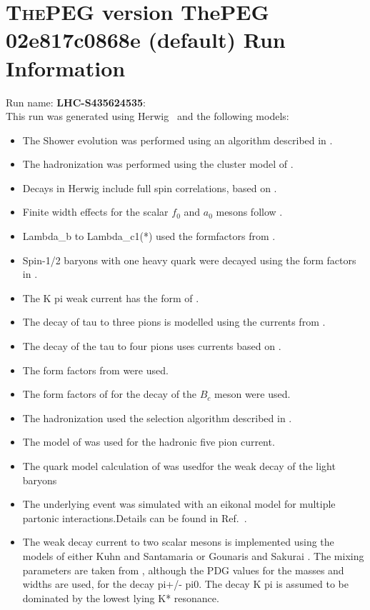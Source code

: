\documentclass{article}
\begin{document}
\appendix
\section[xxx]{\textsc{ThePEG} version ThePEG 02e817c0868e (default) \cite{ThePEG} Run Information}
Run name: \textbf{LHC-S435624535}:\\
This run was generated using Herwig~\cite{Bahr:2008pv} and the following models:
\begin{itemize}
\item The Shower evolution was performed using an algorithm described in \cite{Marchesini:1983bm,Marchesini:1987cf,Gieseke:2003rz,Bahr:2008pv}.
\item The hadronization was performed using the cluster model of \cite{Webber:1983if}.
\item Decays in Herwig include full spin correlations, based on \cite{Richardson:2001df}.
\item Finite width effects for the scalar $f_0$ and $a_0$ mesons follow \cite{Flatte:1976xu}.
\item Lambda_b to Lambda_c1(*) used the formfactors from \cite{Huang:2000xw}.
\item Spin-1/2 baryons with one heavy quark were decayed using the form factors in \cite{Singleton:1990ye}.
\item The K pi weak current has the form of \cite{Finkemeier:1996dh}.
\item The decay of tau to three pions is modelled using the currents from \cite{Asner:1999kj}.
\item The decay of the tau to four pions uses currents based on \cite{Bondar:2002mw}.
\item The form factors from \cite{Ivanov:1996fj} were used.
\item The form factors of \cite{Kiselev:2002vz} for the decay of the $B_c$ meson were used.
\item The hadronization used the selection algorithm described in \cite{Kupco:1998fx}.
\item The model of \cite{Kuhn:2006nw} was used for the hadronic five pion current.
\item The quark model calculation of \cite{Schlumpf:1994fb} was usedfor the weak decay of the light baryons
\item The underlying event was simulated with an eikonal model for multiple partonic interactions.Details can be found in Ref.~\cite{Bahr:2008dy,Bahr:2009ek}.
\item The weak decay current to two scalar mesons is implemented using the models of either Kuhn and Santamaria \cite{Kuhn:1990ad} or Gounaris and Sakurai \cite{Gounaris:1968mw}. The mixing parameters are taken from \cite{Asner:1999kj}, although the PDG values for the masses and widths are used, for the decay pi+/- pi0. The decay K pi is assumed to  be dominated by the lowest lying K* resonance.

\end{itemize}
\end{document}
